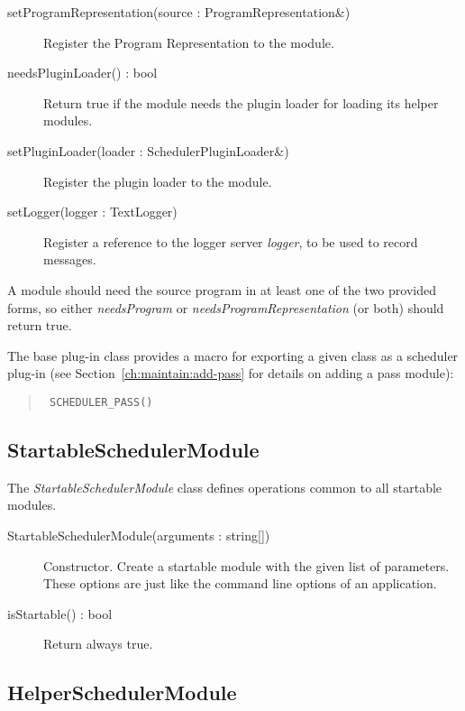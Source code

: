 \documentclass[a4paper,twoside]{tce}
\begin{document}
\begin{description}
\item[setProgramRepresentation(source : ProgramRepresentation\&)]
  Register the Program Representation to the module.

\item[needsPluginLoader() : bool]
  Return true if the module needs the plugin loader for loading its
  helper modules.

\item[setPluginLoader(loader : SchedulerPluginLoader\&)]
  Register the plugin loader to the module.

\item[setLogger(logger : TextLogger)]
  Register a reference to the logger server \emph{logger}, to be used to
  record messages.

\end{description}

A module should need the source program in at least one of the two
provided forms, so either \emph{needsProgram} or
\emph{needsProgramRepresentation} (or both) should return true.

The base plug-in class provides a macro for exporting a given class as a
scheduler plug-in (see Section~\ref{ch:maintain:add-pass} for details on
adding a pass module):

\begin{quote}\tt
  \verb|SCHEDULER_PASS|()
\end{quote}

\subsection{StartableSchedulerModule}

The \emph{StartableSchedulerModule} class defines operations common to all
startable modules.

\begin{description}
\item[StartableSchedulerModule(arguments : string{[]})]
  Constructor. Create a startable module with the given list of parameters.
  These options are just like the command line options of an
  application.

\item[isStartable() : bool]
  Return always true.

\end{description}

\subsection{HelperSchedulerModule}
\end{document}
